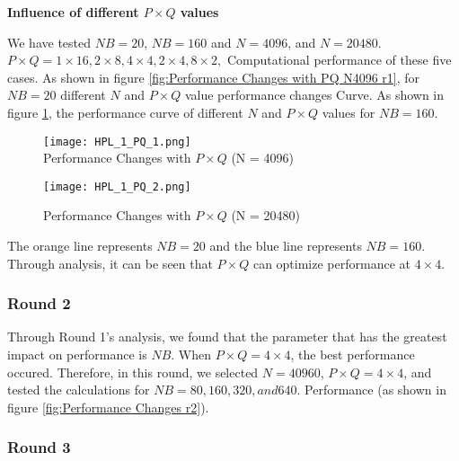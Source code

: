 \documentclass{mcmthesis}
\begin{document}
\textbf{Influence of different $P \times Q$ values}

\par We have tested $NB=20$, $NB=160$ and $N=4096$, and $N=20480$. $P\times Q = 1 \times 16,2 \times 8,4 \times 4, 2 \times 4,8 \times 2,$ Computational performance of these five cases. As shown in figure \ref{fig:Performance Changes with PQ N4096 r1}, for $NB = 20$ different $N$ and $P \times Q$ value performance changes Curve. As shown in figure \ref{fig:Performance Changes with PQ N20480 r1}, the performance curve of different $N$ and $P \times Q$ values for $NB = 160$.


\begin{figure}[htbp]  
\begin{minipage}[t]{0.5\textwidth}
\centering  
\texttt{[image: HPL\_1\_PQ\_1.png]} \\
\caption{Performance Changes with $P\times Q$ (N = 4096)} \label{fig:Performance Changes with PQ N4096 r1}
\end{minipage}
\hspace{1ex}
\begin{minipage}[t]{0.5\textwidth}  
\centering  
\texttt{[image: HPL\_1\_PQ\_2.png]}\\
\caption{Performance Changes with $P\times Q$ (N = 20480)}  \label{fig:Performance Changes with PQ N20480 r1}
\end{minipage}  
\end{figure} 

\par The orange line represents $NB=20$ and the blue line represents $NB=160$. Through analysis, it can be seen that $P \times Q$ can optimize performance at $4\times 4$.

\subsubsection{Round 2}

\par Through Round 1's analysis, we found that the parameter that has the greatest impact on performance is $NB$. When $P\times Q = 4 \times 4$, the best performance occured. Therefore, in this round, we selected $N=40960$, $P\times Q = 4 \times 4$, and tested the calculations for $NB = 80, 160, 320, and 640$. Performance (as shown in figure \ref{fig:Performance Changes r2}).



\subsubsection{Round 3}
\end{document}
